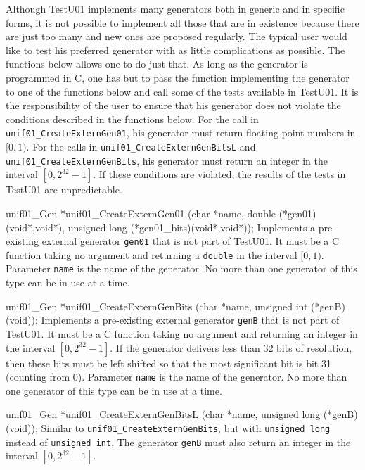 
Although  TestU01 implements many generators both in generic and in
specific forms, it is not possible to implement all those that are in
existence because there are just too many and new ones are proposed 
regularly. The typical user would like to test his preferred generator
with as little complications as possible. The functions below allows one 
to do just that. As long as the generator is programmed in C, 
one has but to pass  the function implementing the generator to one of the
functions below and call some of the tests available in TestU01.
It is the responsibility of the user to ensure that his generator does not
violate the conditions described in the functions below. For the
call in {\tt unif01\_CreateExternGen01}, his generator must return
floating-point numbers in $[0, 1)$. For the calls in
 {\tt unif01\_CreateExternGenBitsL} and  {\tt unif01\_CreateExternGenBits},
 his generator must return an integer in the interval $[0, 2^{32} - 1]$.
If these conditions are violated, the results of the tests in TestU01 are
unpredictable. %
\code


unif01_Gen *unif01_CreateExternGen01 (char *name, double (*gen01)(void*,void*),
                                      unsigned long (*gen01_bits)(void*,void*));
\endcode
\tab Implements a pre-existing external generator {\tt gen01} that is
  not part of TestU01. \label{externgen}
 It must be a C function taking no argument and returning a {\tt double}
 in the interval $[0, 1)$. Parameter {\tt name} is the name of the generator.
 No more than one generator of this type can be in use at a  time. 
\endtab
\code


unif01_Gen *unif01_CreateExternGenBits (char *name,
                                        unsigned int (*genB)(void));
\endcode
\tab Implements a pre-existing external generator {\tt genB} that is not part
 of TestU01. It must be a C function taking no argument and returning
 an integer in the interval $[0, 2^{32} - 1]$.
 If the generator delivers less than 32 bits of resolution, then these 
 bits must be left shifted so that the most significant bit is bit 31
 (counting from 0). Parameter {\tt name} is the name of the generator.
 No more than one generator of this type can be in use at a  time. 
 \endtab
\code


unif01_Gen *unif01_CreateExternGenBitsL (char *name,
                                         unsigned long (*genB)(void));
\endcode
\tab Similar to {\tt unif01\_CreateExternGenBits}, but with
{\tt unsigned long} instead of {\tt unsigned int}. The generator 
{\tt genB} must also return  an integer in the interval $[0, 2^{32} - 1]$.
 \endtab
\code


